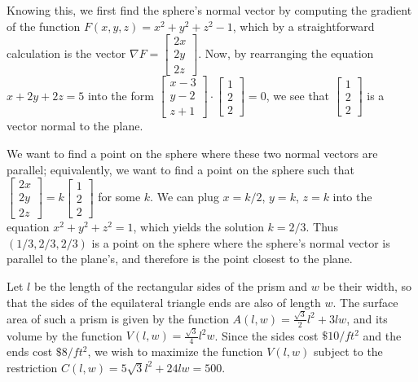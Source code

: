 Knowing this, we first find the sphere's normal vector by computing
the gradient of the function $F(x,y,z) = x^2 + y^2 + z^2 - 1$, which by
a straightforward calculation is the vector
$\nabla F = \begin{bmatrix} 2x \\ 2y \\ 2z \end{bmatrix}$.  Now, by
rearranging the equation $x + 2y + 2z = 5$ into the form
$\begin{bmatrix} x - 3 \\ y -2 \\ z + 1 \end{bmatrix} \cdot
 \begin{bmatrix} 1 \\ 2 \\ 2 \end{bmatrix} = 0$, we see that
$\begin{bmatrix} 1 \\ 2 \\ 2 \end{bmatrix}$ is a vector normal to the plane.

We want to find a point on the sphere where these two normal vectors are
parallel; equivalently, we want to find a point on the sphere such that
$\begin{bmatrix} 2x \\ 2y \\ 2z \end{bmatrix}
 = k\begin{bmatrix} 1 \\ 2 \\ 2 \end{bmatrix}$ for some $k$.  We can plug
$x = k/2$, $y = k$, $z = k$ into the equation $x^2 + y^2 + z^2 = 1$, which
yields the solution $k = 2/3$.  Thus $(1/3, 2/3, 2/3)$ is a point on the
sphere where the sphere's normal vector is parallel to the plane's, and
therefore is the point closest to the plane.

\item

Let $l$ be the length
of the rectangular sides of the prism and $w$ be their width, so that
the sides of the equilateral triangle ends are also of length $w$.
The surface area of such a prism is given by the function $A(l,w) =
\frac{\sqrt{3}}{2}l^2 + 3lw$, and its volume by the function $V(l,w) =
\frac{\sqrt{3}}{4}l^2w$.  Since the sides cost $\$10/ft^2$ and the ends
cost $\$8/ft^2$, we wish to maximize the function $V(l,w)$ subject to
the restriction $C(l,w) = 5\sqrt{3}l^2 + 24lw = 500$.

